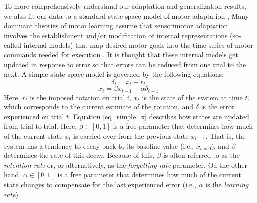 \documentclass[jou, 11pt, longtable, floatsintext, notab]{apa6}
\begin{document}
To more comprehensively understand our adaptation and
generalization results, we also fit our data to a standard
state-space model of motor adaptation
\cite{thoroughman_learning_2000}, \cite{cheng_modeling_2006}
Many dominant theories of motor learning assume that
sensorimotor adaptation involves the establishment and/or
modification of internal representations (so-called internal
models) that map desired motor goals into the time series of
motor commands needed for execution
\cite{wolpert_internal_1998}. It is thought that these
internal models get updated in response to error so that
errors can be reduced from one trial to the next. A simple
state-space model is governed by the following equations:
\begin{equation}
  \delta_{t} = x_{t} - r_{t}
  \label{eq_simple_err}
\end{equation}
\begin{equation}
  x_{t} = \beta x_{t-1} - \alpha \delta_{t-1}
  \label{eq_simple_x}
\end{equation}
Here, $r_t$ is the imposed rotation on trial $t$, $x_t$ is
the state of the system at time $t$, which corresponds to
the current estimate of the rotation, and $\delta$ is the
error experienced on trial $t$. Equation \ref{eq_simple_x}
describes how states are updated from trial to trial. Here,
$\beta \in [0,1]$ is a free parameter that
determines how much of the current state $x_t$ is carried
over from the previous state $x_{t-1}$. That is, the system
has a tendency to decay back to its baseline value (i.e.,
$x_{t=0}$), and $\beta$ determines the rate of this decay.
Because of this, $\beta$ is often referred to as the
\emph{retention rate} or, or alternatively, as the
\emph{forgetting rate} parameter. On the other hand, $\alpha
\in [0,1]$ is a free parameter that determines how much of
the current state changes to compensate for the last
experienced error (i.e., $\alpha$ is the \emph{learning
rate}).

\end{document}
